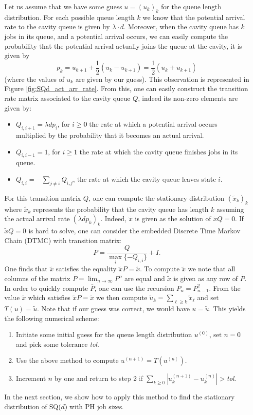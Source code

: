 \documentclass[12pt]{report}
\begin{document}
Let us assume that we have some guess $u=(u_k)_k$ for the queue length distribution. For each possible queue length $k$ we know that the potential arrival rate to the cavity queue is given by $\lambda \cdot d$. Moreover, when the cavity queue has $k$ jobs in its queue, and a potential arrival occurs, we can easily compute the probability that the potential arrival actually joins the queue at the cavity, it is given by 
$$
p_k = u_{k+1} + \frac{1}{2} (u_k - u_{k+1}) = \frac{1}{2} (u_k + u_{k+1})
$$
(where the values of $u_k$ are given by our guess). This observation is represented in Figure \ref{fig:SQd_act_arr_rate}. From this, one can easily construct the transition rate matrix associated to the cavity queue $Q$, indeed its non-zero elements are given by:
\begin{itemize}
	\item $Q_{i, i+1} = \lambda d p_i$, for $i \geq 0$ the rate at which a potential arrival occurs multiplied by the probability that it becomes an actual arrival.
	\item $Q_{i,i-1} = 1$, for $i \geq 1$ the rate at which the cavity queue finishes jobs in its queue.
	\item $Q_{i,i} = -\sum_{j\neq i} Q_{i,j}$, the rate at which the cavity queue leaves state $i$.
\end{itemize}
For this transition matrix $Q$, one can compute the stationary distribution $(\tilde x_k)_k$ where $\tilde x_k$ represents the probability that the cavity queue has length $k$ assuming the actual arrival rate $(\lambda d p_k)_k$. Indeed, $\tilde x$ is given as the solution of $\tilde xQ = 0$. If $\tilde xQ = 0$ is hard to solve, one can consider the embedded Discrete Time Markov Chain (DTMC) with transition matrix:
$$
P = \frac{Q}{\max_i \{-Q_{i,i} \}} + I.
$$
One finds that $\tilde x$ satisfies the equality $\tilde xP = \tilde x$. To compute $\tilde x$ we note that all columns of the matrix $\bar P = \lim_{n\rightarrow\infty} P^n$ are equal and $\tilde x$ is given as any row of $\bar P$. In order to quickly compute $\bar P$, one can use the recursion $P_n = P_{n-1}^2$. From the value $\tilde x$ which satisfies $\tilde xP = \tilde x$ we then compute $\tilde{u}_k = \sum_{\ell \geq k} \tilde x_\ell$ and set $T(u) = \tilde u$. Note that if our guess was correct, we would have $u = \tilde{u}$. This yields the following numerical scheme:
\begin{enumerate}
	\item Initiate some initial guess for the queue length distribution $u^{(0)}$, set $n=0$ and pick some tolerance \textit{tol}.
	\item Use the above method to compute $u^{(n+1)} = T(u^{(n)})$.
	\item Increment $n$ by one and return to step 2 if $\sum_{k\geq 0} \left| u_k^{(n+1)} - u_k^{(n)} \right| > $\textit{tol}.
\end{enumerate}
In the next section, we show how to apply this method to find the stationary distribution of SQ($d$) with PH job sizes.
\end{document}
